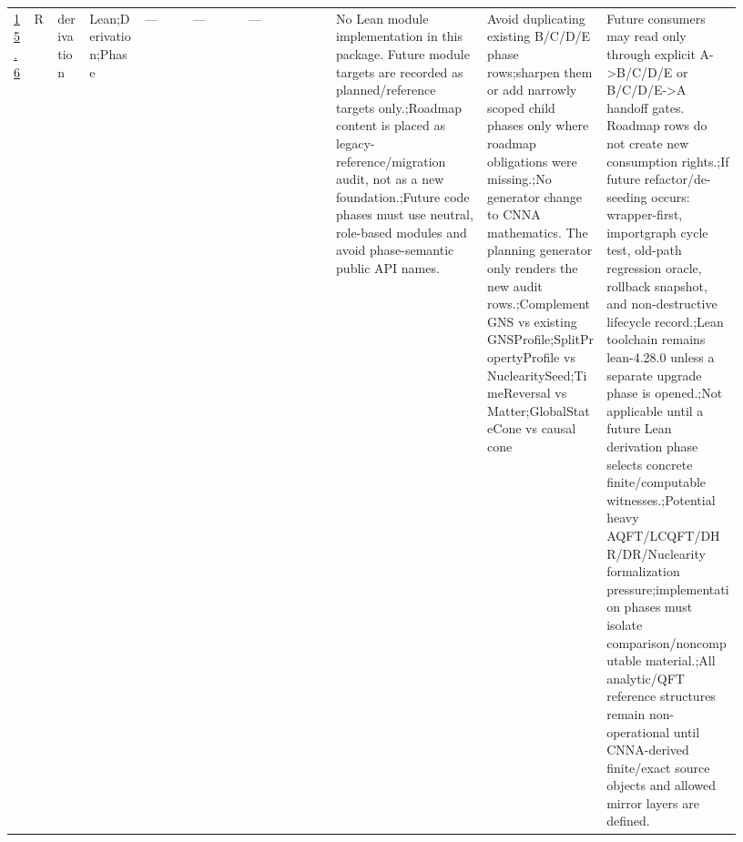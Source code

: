 \begin{longtable}{L{0.026\linewidth} L{0.024\linewidth} L{0.045\linewidth} L{0.07\linewidth} L{0.065\linewidth} L{0.075\linewidth} L{0.11\linewidth} L{0.19\linewidth} L{0.155\linewidth} L{0.17\linewidth}}
\hline
\addlinespace[0.24em]
\hyperlink{phase-row-15-6}{15.6} & R & derivation & Lean;\newline Derivation;\newline Phase & --- & --- & --- & No Lean module implementation in this package. Future module targets are recorded as planned/\allowbreak{}reference targets only.;\newline Roadmap content is placed as legacy-reference/\allowbreak{}migration audit, not as a new foundation.;\newline Future code phases must use neutral, role-based modules and avoid phase-semantic public API names. & Avoid duplicating existing B/\allowbreak{}C/\allowbreak{}D/\allowbreak{}E phase rows;\newline sharpen them or add narrowly scoped child phases only where roadmap obligations were missing.;\newline No generator change to CNNA mathematics. The planning generator only renders the new audit rows.;\newline ComplementGNS vs existing GNSProfile;\newline SplitPropertyProfile vs NuclearitySeed;\newline TimeReversal vs Matter;\newline GlobalStateCone vs causal cone & Future consumers may read only through explicit A->B/\allowbreak{}C/\allowbreak{}D/\allowbreak{}E or B/\allowbreak{}C/\allowbreak{}D/\allowbreak{}E->A handoff gates. Roadmap rows do not create new consumption rights.;\newline If future refactor/\allowbreak{}de-seeding occurs: wrapper-first, importgraph cycle test, old-path regression oracle, rollback snapshot, and non-destructive lifecycle record.;\newline Lean toolchain remains lean-4.28.0 unless a separate upgrade phase is opened.;\newline Not applicable until a future Lean derivation phase selects concrete finite/\allowbreak{}computable witnesses.;\newline Potential heavy AQFT/\allowbreak{}LCQFT/\allowbreak{}DHR/\allowbreak{}DR/\allowbreak{}Nuclearity formalization pressure;\newline implementation phases must isolate comparison/\allowbreak{}noncomputable material.;\newline All analytic/\allowbreak{}QFT reference structures remain non-operational until CNNA-derived finite/\allowbreak{}exact source objects and allowed mirror layers are defined.\\

\end{longtable}
